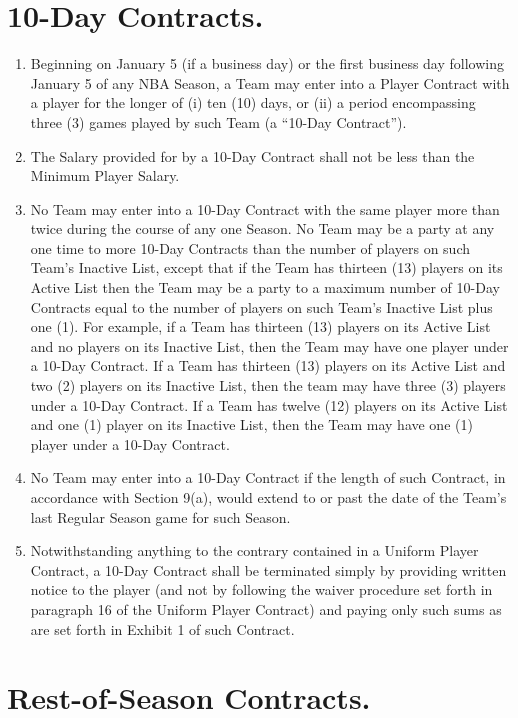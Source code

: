 \documentclass[
]{book}
\providecommand{\tightlist}{%
  \setlength{\itemsep}{0pt}\setlength{\parskip}{0pt}}
\begin{document}
\hypertarget{day-contracts.}{%
\section{10-Day Contracts.}\label{day-contracts.}}

\begin{enumerate}
\def\labelenumi{(\alph{enumi})}
\tightlist
\item
  Beginning on January 5 (if a business day) or the first business day following January 5 of any NBA Season, a Team may enter into a Player Contract with a player for the longer of (i) ten (10) days, or (ii) a period encompassing three (3) games played by such Team (a ``10-Day Contract'').
\item
  The Salary provided for by a 10-Day Contract shall not be less than the Minimum Player Salary.
\item
  No Team may enter into a 10-Day Contract with the same player more than twice during the course of any one Season. No Team may be a party at any one time to more 10-Day Contracts than the number of players on such Team's Inactive List, except that if the Team has thirteen (13) players on its Active List then the Team may be a party to a maximum number of 10-Day Contracts equal to the number of players on such Team's Inactive List plus one (1). For example, if a Team has thirteen (13) players on its Active List and no players on its Inactive List, then the Team may have one player under a 10-Day Contract. If a Team has thirteen (13) players on its Active List and two (2) players on its Inactive List, then the team may have three (3) players under a 10-Day Contract. If a Team has twelve (12) players on its Active List and one (1) player on its Inactive List, then the Team may have one (1) player under a 10-Day Contract.
\item
  No Team may enter into a 10-Day Contract if the length of such Contract, in accordance with Section 9(a), would extend to or past the date of the Team's last Regular Season game for such Season.
\item
  Notwithstanding anything to the contrary contained in a Uniform Player Contract, a 10-Day Contract shall be terminated simply by providing written notice to the player (and not by following the waiver procedure set forth in paragraph 16 of the Uniform Player Contract) and paying only such sums as are set forth in Exhibit 1 of such Contract.
\end{enumerate}

\hypertarget{rest-of-season-contracts.}{%
\section{Rest-of-Season Contracts.}\label{rest-of-season-contracts.}}
\end{document}
